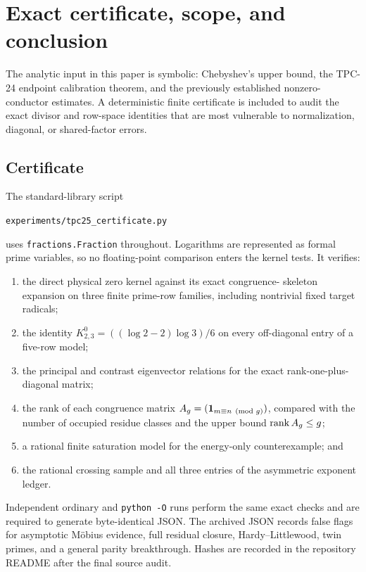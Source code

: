 \section{Exact certificate, scope, and conclusion}
\label{sec:tpc25-certificate-scope}

The analytic input in this paper is symbolic: Chebyshev's upper bound,
the TPC-24 endpoint calibration theorem, and the previously established
nonzero-conductor estimates.  A deterministic finite certificate is
included to audit the exact divisor and row-space identities that are
most vulnerable to normalization, diagonal, or shared-factor errors.

\subsection{Certificate}

The standard-library script
\begin{center}
 \texttt{experiments/tpc25\_certificate.py}
\end{center}
uses \texttt{fractions.Fraction} throughout.  Logarithms are represented
as formal prime variables, so no floating-point comparison enters the
kernel tests.  It verifies:
\begin{enumerate}[label=\textup{(\arabic*)}]
 \item the direct physical zero kernel against its exact congruence-
 skeleton expansion on three finite prime-row families, including
 nontrivial fixed target radicals;
 \item the identity
 \(K^0_{2,3}=((\log2-2)\log3)/6\) on every off-diagonal entry of a
 five-row model;
 \item the principal and contrast eigenvector relations for the exact
 rank-one-plus-diagonal matrix;
 \item the rank of each congruence matrix
 \(A_g=(\mathbf 1_{m\equiv n\pmod g})\), compared with the number of
 occupied residue classes and the upper bound \(\operatorname{rank} A_g\le g\);
 \item a rational finite saturation model for the energy-only
 counterexample; and
 \item the rational crossing sample and all three entries of the
 asymmetric exponent ledger.
\end{enumerate}

Independent ordinary and \texttt{python -O} runs perform the same exact
checks and are required to generate byte-identical JSON.  The archived
JSON records false flags for asymptotic M\"obius evidence, full residual
closure, Hardy--Littlewood, twin primes, and a general parity
breakthrough.  Hashes are recorded in the repository README after the
final source audit.

